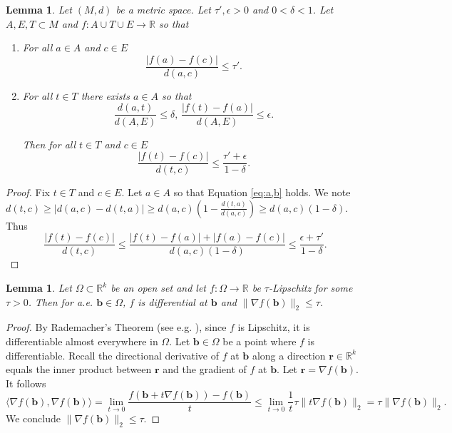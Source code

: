 \documentclass[11pt]{article}
\theoremstyle{plain}
\newtheorem{lem}[thm]{Lemma}
\theoremstyle{definition}
\def\R{\mathbb{R}}
\def\rr{\mathbf r}
\def\bb{\mathbf b}
\numberwithin{figure}{section}
\begin{document}
\begin{lem}\label{lem:Lipschitz constant continuity}
Let $(M,d)$ be a metric space. Let $\tau',\epsilon>0$ and $0<\delta<1$. Let $A,E, T\subset M$ and $f:A\cup T\cup E\rightarrow \R$  so that
\begin{enumerate}
    \item 
    For all $a\in A$ and $c\in E$
    $$
\frac{|f(a)-f(c)|}{d(a,c)}\leq \tau'.
    $$
    \item 
    For all $t\in T$ there exists $a\in A$ so that 
   \begin{equation}\label{eq:a,b}
       \frac{d(a,t)}{d(A,E)}\leq \delta,\, \frac{|f(t)-f(a)|}{d(A,E)}\leq \epsilon.
   \end{equation}

    Then for all $t\in T$ and $c\in E$
    $$
\frac{|f(t)-f(c)|}{d(t,c)}\leq \frac{\tau'+\epsilon}{1-\delta}.
    $$
\end{enumerate}
\end{lem}
\begin{proof}
  Fix $t\in T$ and $c\in E$. Let $a\in A $ so that Equation \eqref{eq:a,b} holds.  We note $d(t,c)\geq |d(a,c)-d(t,a)|\geq d(a,c)(1-\frac{d(t,a)}{d(a,c)})\geq d(a,c)(1-\delta)$.
  Thus 
  $$
\frac{|f(t)-f(c)|}{d(t,c)}\leq \frac{|f(t)-f(a)|+|f(a)-f(c)|}{d(a,c)(1-\delta)}\leq \frac{\epsilon+\tau'}{1-\delta}. 
  $$
\end{proof}

\begin{lem}\label{lem:Lipschitz gradient}
Let  $\Omega\subset  \R^k$ be an open set and let $f: \Omega\rightarrow \R$ be $\tau$-Lipschitz for some $\tau>0$. Then for a.e. $\bb\in \Omega$, $f$ is differential at $\bb$ and $\|\nabla f(\bb)\|_2\leq \tau$.
\end{lem}
\begin{proof}
    By Rademacher’s Theorem (see e.g. \cite[\S 5.8, Theorem 6]{EvansPDE}), since $f$ is Lipschitz, it is differentiable almost everywhere in $\Omega$. Let $\bb\in \Omega$ be a point where $f$ is differentiable. Recall the directional derivative of $f$ at $\bb$ along a direction $\rr\in\R^k$ equals the inner product between $\rr$ and the gradient of $f$ at $\bb$. Let $\rr=\nabla f(\bb)$. It follows
    $$\langle \nabla f(\bb), \nabla f(\bb)\rangle=\lim_{t\rightarrow 0} \frac{f(\bb+t\nabla f(\bb))-f(\bb)}{t}\leq \lim_{t\rightarrow 0} \frac{1}{t}\tau \|t\nabla f(\bb)\|_2=\tau \|\nabla f(\bb)\|_2.$$
    We conclude $\|\nabla f(\bb)\|_2\leq \tau$.
\end{proof}
\end{document}
